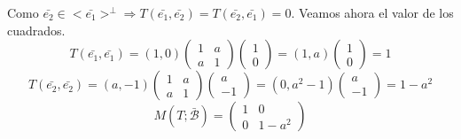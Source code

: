 \begin{ejercicio}
\begin{itemize}
\begin{itemize}
            Como $\bar{e_2} \in <\bar{e_1}>^\perp \Longrightarrow T(\bar{e_1}, \bar{e_2}) = T(\bar{e_2}, \bar{e_1}) = 0$. Veamos ahora el valor de los cuadrados.
            \begin{equation*}
                T(\bar{e_1}, \bar{e_1}) = (1,0) \left( \begin{array}{cc}
                    1 & a \\
                    a & 1
                \end{array} \right) \left( \begin{array}{c}
                    1 \\ 0
                \end{array}\right) = (1,a)\left( \begin{array}{c}
                    1 \\ 0
                \end{array}\right) = 1
            \end{equation*}
            \begin{equation*}
                T(\bar{e_2}, \bar{e_2}) = (a, -1) \left( \begin{array}{cc}
                    1 & a \\
                    a & 1
                \end{array} \right) \left( \begin{array}{c}
                    a \\ -1
                \end{array}\right) = (0,a^2-1)\left( \begin{array}{c}
                    a \\ -1
                \end{array}\right) = 1-a^2
            \end{equation*}
            \begin{equation*}
                M(T;\bar{\mathcal{B}}) = \left( \begin{array}{cc}
                    1 & 0 \\
                    0 & 1-a^2
                \end{array} \right)
            \end{equation*}


\end{itemize}
\end{itemize}
\end{ejercicio}
